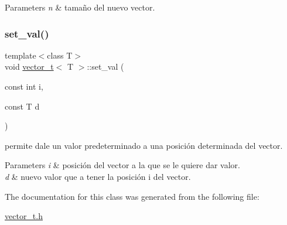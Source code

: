 \begin{DoxyParams}{Parameters}
{\em n} & tamaño del nuevo vector. \\
\hline
\end{DoxyParams}
\mbox{\label{classvector__t_a9a6ad9d61d4be782d136e486bc5d46b4}} 
\subsubsection{\texorpdfstring{set\+\_\+val()}{set\_val()}}
{\footnotesize\ttfamily template$<$class T$>$ \\
void \hyperlink{classvector__t}{vector\+\_\+t}$<$ T $>$\+::set\+\_\+val (\begin{DoxyParamCaption}\item[{const int}]{i,  }\item[{const T}]{d }\end{DoxyParamCaption})}



permite dale un valor predeterminado a una posición determinada del vector. 


\begin{DoxyParams}{Parameters}
{\em i} & posición del vector a la que se le quiere dar valor. \\
\hline
{\em d} & nuevo valor que a tener la posición i del vector. \\
\hline
\end{DoxyParams}


The documentation for this class was generated from the following file\+:\begin{DoxyCompactItemize}
\item 
\hyperlink{vector__t_8h}{vector\+\_\+t.\+h}\end{DoxyCompactItemize}
